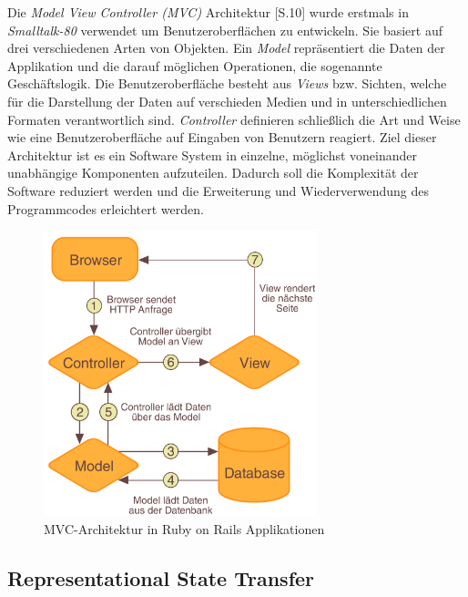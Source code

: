 Die \textit{Model View Controller (MVC)} Architektur
\cite{Gamma95Design}[S.10] wurde erstmals in \textit{Smalltalk-80}
verwendet um Benutzeroberflächen zu entwickeln. Sie basiert auf drei
verschiedenen Arten von Objekten. Ein \textit{Model} repräsentiert die
Daten der Applikation und die darauf möglichen Operationen, die
sogenannte Geschäftslogik. Die Benutzeroberfläche besteht aus
\textit{Views} bzw. Sichten, welche für die Darstellung der Daten auf
verschieden Medien und in unterschiedlichen Formaten verantwortlich
sind. \textit{Controller} definieren schließlich die Art und Weise wie
eine Benutzeroberfläche auf Eingaben von Benutzern reagiert. Ziel
dieser Architektur ist es ein Software System in einzelne, möglichst
voneinander unabhängige Komponenten aufzuteilen. Dadurch soll die
Komplexität der Software reduziert werden und die Erweiterung und
Wiederverwendung des Programmcodes erleichtert werden.

\begin{figure}[h]
  \begin{center}
    \includegraphics[width=300px]{bilder/mvc}
    \caption{MVC-Architektur in Ruby on Rails Applikationen}
  \end{center}
\end{figure}

\subsection{Representational State Transfer}
\label{rest}

